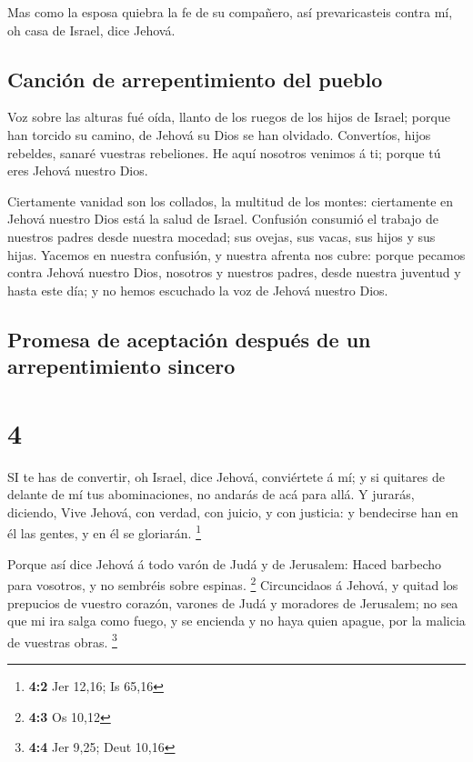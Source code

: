  Mas como la esposa quiebra la fe de su compañero, así
prevaricasteis contra mí, oh casa de Israel, dice Jehová.

\hypertarget{canciuxf3n-de-arrepentimiento-del-pueblo}{%
\subsection{Canción de arrepentimiento del
pueblo}\label{canciuxf3n-de-arrepentimiento-del-pueblo}}

 Voz sobre las alturas fué oída, llanto de los ruegos de
los hijos de Israel; porque han torcido su camino, de Jehová su Dios se
han olvidado.  Convertíos, hijos rebeldes, sanaré vuestras
rebeliones. He aquí nosotros venimos á ti; porque tú eres Jehová nuestro
Dios.

 Ciertamente vanidad son los collados, la multitud de los
montes: ciertamente en Jehová nuestro Dios está la salud de Israel.
 Confusión consumió el trabajo de nuestros padres desde
nuestra mocedad; sus ovejas, sus vacas, sus hijos y sus hijas.
 Yacemos en nuestra confusión, y nuestra afrenta nos cubre:
porque pecamos contra Jehová nuestro Dios, nosotros y nuestros padres,
desde nuestra juventud y hasta este día; y no hemos escuchado la voz de
Jehová nuestro Dios.

\hypertarget{promesa-de-aceptaciuxf3n-despuuxe9s-de-un-arrepentimiento-sincero}{%
\subsection{Promesa de aceptación después de un arrepentimiento
sincero}\label{promesa-de-aceptaciuxf3n-despuuxe9s-de-un-arrepentimiento-sincero}}

\hypertarget{section-3}{%
\section{4}\label{section-3}}

 SI te has de convertir, oh Israel, dice Jehová, conviértete
á mí; y si quitares de delante de mí tus abominaciones, no andarás de
acá para allá.  Y jurarás, diciendo, Vive Jehová, con
verdad, con juicio, y con justicia: y bendecirse han en él las gentes, y
en él se gloriarán. \footnote{\textbf{4:2} Jer 12,16; Is 65,16}

 Porque así dice Jehová á todo varón de Judá y de Jerusalem:
Haced barbecho para vosotros, y no sembréis sobre espinas. \footnote{\textbf{4:3}
  Os 10,12}  Circuncidaos á Jehová, y quitad los prepucios
de vuestro corazón, varones de Judá y moradores de Jerusalem; no sea que
mi ira salga como fuego, y se encienda y no haya quien apague, por la
malicia de vuestras obras. \footnote{\textbf{4:4} Jer 9,25; Deut 10,16}

